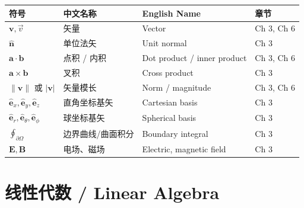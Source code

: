 \begin{center}
\renewcommand{\arraystretch}{1.25}
\begin{tabular}{@{}llll@{}}
\toprule
\textbf{符号} & \textbf{中文名称} & \textbf{English Name} & \textbf{章节} \\
\midrule
$\mathbf{v}, \vec{v}$ & 矢量 & Vector & Ch 3, Ch 6 \\
$\hat{\mathbf{n}}$ & 单位法矢 & Unit normal & Ch 3 \\
$\mathbf{a} \cdot \mathbf{b}$ & 点积 / 内积 & Dot product / inner product & Ch 3, Ch 6 \\
$\mathbf{a} \times \mathbf{b}$ & 叉积 & Cross product & Ch 3 \\
$\|\mathbf{v}\|$ 或 $|\mathbf{v}|$ & 矢量模长 & Norm / magnitude & Ch 3, Ch 6 \\
$\mathbf{\hat{e}}_x, \mathbf{\hat{e}}_y, \mathbf{\hat{e}}_z$ & 直角坐标基矢 & Cartesian basis & Ch 3 \\
$\mathbf{\hat{e}}_r, \mathbf{\hat{e}}_\theta, \mathbf{\hat{e}}_\phi$ & 球坐标基矢 & Spherical basis & Ch 3 \\
$\displaystyle \oint_{\partial \Omega}$ & 边界曲线/曲面积分 & Boundary integral & Ch 3 \\
$\mathbf{E}, \mathbf{B}$ & 电场、磁场 & Electric, magnetic field & Ch 3 \\
\bottomrule
\end{tabular}
\end{center}

\section{线性代数 / Linear Algebra}

